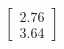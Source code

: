 \documentclass[preview]{standalone}
\begin{document}
\begin{align*}
\begin{bmatrix} 2.76 \\ 3.64 \end{bmatrix}
\end{align*}
\end{document}
